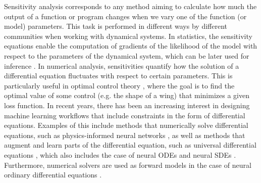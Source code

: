 Sensitivity analysis corresponds to any method aiming to calculate how much the output of a function or program changes when we vary one of the function (or model) parameters. 
This task is performed in different ways by different communities when working with dynamical systems. 
In statistics, the sensitivity equations enable the computation of gradients of the likelihood of the model with respect to the parameters of the dynamical system, which can be later used for inference \cite{ramsay2017dynamic}. 
In numerical analysis, sensitivities quantify how the solution of a differential equation fluctuates with respect to certain parameters. 
This is particularly useful in optimal control theory \cite{Giles_Pierce_2000}, where the goal is to find the optimal value of some control (e.g. the shape of a wing) that minimizes a given loss function. 
In recent years, there has been an increasing interest in designing machine learning workflows that include constraints in the form of differential equations. 
Examples of this include methods that numerically solve differential equations, such as physics-informed neural networks \cite{PINNs_2019}, as well as methods that augment and learn parts of the differential equation, such as universal differential equations \cite{rackauckas2020universal, Dandekar_2020}, which also includes the case of neural ODEs \cite{chen_neural_2019} and neural SDEs \cite{li2020scalable}.
Furthermore, numerical solvers are used as forward models in the case of neural ordinary differential equations \cite{chen_neural_2019}.


